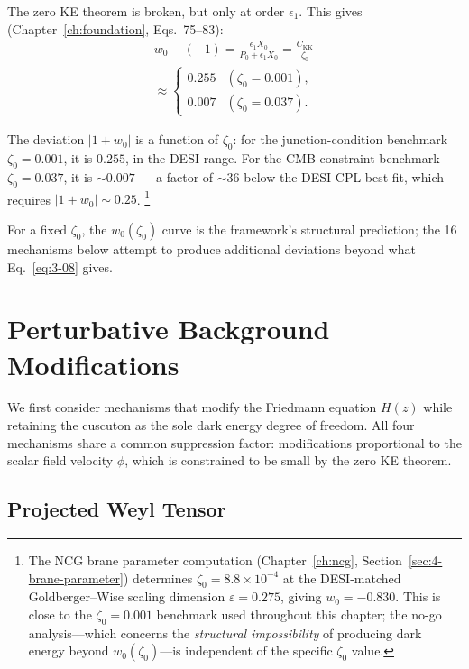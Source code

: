 The zero KE theorem is broken, but only at order $\epsilon_1$. This gives (Chapter~\ref{ch:foundation}, Eqs.~75--83):
\begin{multline}
  w_0 - (-1) = \frac{\epsilon_1 X_0}{P_0 + \epsilon_1 X_0}
    = \frac{C_{\mathrm{KK}}}{\zeta_0} \\
    \approx \begin{cases} 0.255 & (\zeta_0 = 0.001), \\ 0.007 & (\zeta_0 = 0.037). \end{cases}
  \label{eq:3-08}
\end{multline}

The deviation $|1 + w_0|$ is a function of $\zeta_0$: for the junction-condition benchmark $\zeta_0 = 0.001$, it is $0.255$, in the DESI range. For the CMB-constraint benchmark $\zeta_0 = 0.037$, it is ${\sim}0.007$ --- a factor of ${\sim}36$ below the DESI CPL best fit, which requires $|1 + w_0| \sim 0.25$.%
\footnote{The NCG brane parameter computation (Chapter~\ref{ch:ncg}, Section~\ref{sec:4-brane-parameter}) determines $\zeta_0 = 8.8 \times 10^{-4}$ at the DESI-matched Goldberger--Wise scaling dimension $\varepsilon = 0.275$, giving $w_0 = -0.830$. This is close to the $\zeta_0 = 0.001$ benchmark used throughout this chapter; the no-go analysis---which concerns the \emph{structural impossibility} of producing dark energy beyond $w_0(\zeta_0)$---is independent of the specific $\zeta_0$ value.}

For a fixed $\zeta_0$, the $w_0(\zeta_0)$ curve is the framework's structural prediction; the 16 mechanisms below attempt to produce additional deviations beyond what Eq.~\eqref{eq:3-08} gives.

\section{Perturbative Background Modifications}
\label{sec:3-perturbative}

We first consider mechanisms that modify the Friedmann equation $H(z)$ while retaining the cuscuton as the sole dark energy degree of freedom. All four mechanisms share a common suppression factor: modifications proportional to the scalar field velocity $\dot{\phi}$, which is constrained to be small by the zero KE theorem.

\subsection{Projected Weyl Tensor}
\label{sec:3-weyl}

